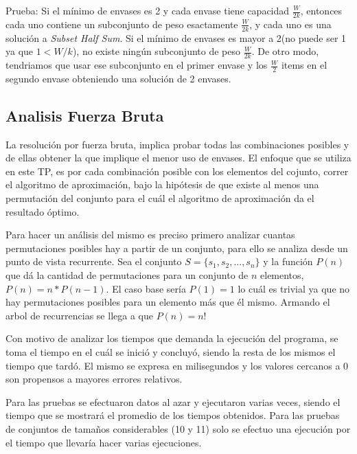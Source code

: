 \documentclass[12pt]{article}
\begin{document}
		Prueba: Si el mínimo de envases es 2 y cada envase tiene capacidad $\frac{W}{2k}$,
		 entonces cada uno contiene un subconjunto de peso esactamente $\frac{W}{2k}$, y
		 cada uno es una solución a \emph{Subset Half Sum}. Si el mínimo de envases
		 es mayor a 2(no puede ser 1 ya que $1<W/k$), no existe ningún subconjunto de peso $\frac{W}{2k}$. De 
		 otro modo, tendriamos que usar ese subconjunto en el primer envase y los
		 $\frac{W}{2}$ items en el segundo envase obteniendo una solución de 2 envases.
	
	\subsection{Analisis Fuerza Bruta}
		La resolución por fuerza bruta, implica probar todas las combinaciones 
		posibles y de ellas obtener la que implique el menor uso de envases.
		El enfoque que se utiliza en este TP, es por cada combinación posible
		con los elementos del cojunto, correr el algoritmo de aproximación, 
		bajo la hipótesis de que existe al menos una permutación del conjunto
		para el cuál el algoritmo de aproximación da el resultado óptimo.
		
		Para hacer un análisis del mismo es preciso primero analizar cuantas
		permutaciones posibles hay a partir de un conjunto, para ello
		se analiza desde un punto de vista recurrente. Sea el conjunto 
		$S=\{s_{1},s_{2},...,s_{n}\}$ y la función $P(n)$ que dá la cantidad
		de permutaciones para un conjunto de $n$ elementos, $P(n)=n*P(n-1)$.
		El caso base sería $P(1)=1$ lo cuál es trivial ya que no hay permutaciones
		posibles para un elemento más que él mismo. Armando el arbol de 
		recurrencias se llega a que $P(n)=n!$
	
		Con motivo de analizar los tiempos que demanda la ejecución del programa,
		se toma el tiempo en el cuál se inició y concluyó, siendo la resta
		de los mismos el tiempo que tardó. El mismo se expresa en milisegundos y
		los valores cercanos a 0 son propensos a mayores errores relativos.
		
		Para las pruebas se efectuaron datos al azar y ejecutaron varias veces,
		siendo el tiempo que se mostrará el promedio de los tiempos obtenidos.
		Para las pruebas de conjuntos de tamaños considerables (10 y 11) solo
		se efectuo una ejecución por el tiempo que llevaría hacer varias
		ejecuciones.
		
\end{document}
